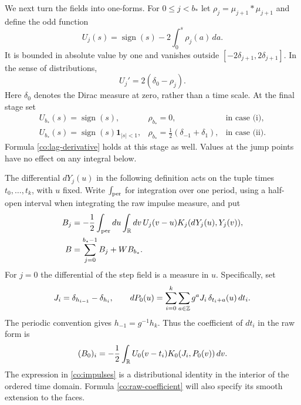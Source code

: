 We next turn the fields into one-forms.  For $0\leq j<b_*$ let
$\rho_j=\mu_{j+1}*\mu_{j+1}$ and define the odd function
\begin{equation}
 U_j(s)=\operatorname{sign}(s)-2\int_0^s\rho_j(a)\,da.
 \label{co:lag-kernels}
\end{equation}
It is bounded in absolute value by one and vanishes outside
$[-2\delta_{j+1},2\delta_{j+1}]$.  In the sense of distributions,
\begin{equation}
 U_j'=2(\delta_0-\rho_j).
 \label{co:lag-derivative}
\end{equation}
Here $\delta_0$ denotes the Dirac measure at zero, rather than a time
scale.  At the final stage set
\begin{equation}
 \begin{array}{lll}
 U_{b_*}(s)=\operatorname{sign}(s),&\rho_{b_*}=0,
 &\text{in case (i)},\\[2pt]
 U_{b_*}(s)=\operatorname{sign}(s)\mathbf1_{|s|<1},&
 \rho_{b_*}=\tfrac12(\delta_{-1}+\delta_1),
 &\text{in case (ii)}.
 \end{array}
 \label{co:last-kernel}
\end{equation}
Formula \eqref{co:lag-derivative} holds at this stage as well.  Values at
the jump points have no effect on any integral below.

The differential $dY_j(u)$ in the following definition acts on the tuple
times $t_0,\ldots,t_k$, with $u$ fixed.  Write $\int_{\rm per}$ for
integration over one period, using a half-open interval when integrating
the raw impulse measure, and put
\begin{equation}
 \begin{split}
 B_j&=-\frac12\int_{\rm per}du\int_{\mathbb R}dv\,
             U_j(v-u)K_j(dY_j(u),Y_j(v)),\\
 B&=\sum_{j=0}^{b_*-1}B_j+WB_{b_*}.
 \end{split}
 \label{co:forms}
\end{equation}
For $j=0$ the differential of the step field is a measure in $u$.
Specifically, set
\begin{equation}
 J_i=\delta_{h_{i-1}}-\delta_{h_i},\qquad
 dP_0(u)=\sum_{i=0}^k\sum_{a\in\mathbb Z}
                  g^aJ_i\,\delta_{t_i+a}(u)\,dt_i.
 \label{co:impulses}
\end{equation}
The periodic convention gives $h_{-1}=g^{-1}h_k$.  Thus the coefficient of
$dt_i$ in the raw form is
\begin{equation}
 (B_0)_i=-\frac12\int_{\mathbb R}U_0(v-t_i)K_0(J_i,P_0(v))\,dv.
 \label{co:raw-coefficient}
\end{equation}
The expression in \eqref{co:impulses} is a distributional identity in the
interior of the ordered time domain.  Formula \eqref{co:raw-coefficient}
will also specify its smooth extension to the faces.

